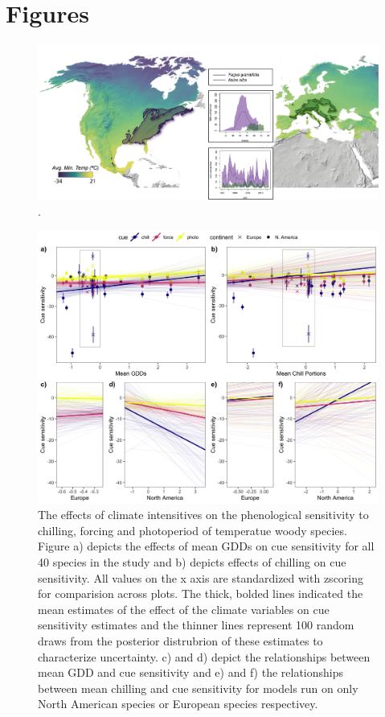\documentclass[12pt]{article}\usepackage[]{graphicx}\usepackage[]{color}
\begin{document}


\section*{Figures}

\begin{figure}[h!]
    \centering
 \includegraphics[width=\textwidth]{..//..//analyses/ranges/figures/concept figure draft2.png} 
    \caption{. }
    \label{fig:concept}
\end{figure}

\begin{figure}[h!]
    \centering
 \includegraphics[width=\textwidth]{..//..//analyses/ranges/figures/mock2.jpeg} 
    \caption{The effects of climate intensitives on the phenological sensitivity to chilling, forcing and photoperiod of temperatue woody species. Figure a) depicts the effects of mean GDDs on cue sensitivity for all 40 species in the study and b) depicts effects of chilling on cue sensitivity. All values on the x axis are standardized with zscoring for comparision across plots. The thick, bolded lines indicated the mean estimates of the effect of the climate variables on cue sensitivity estimates and the thinner lines represent 100 random draws from the posterior distrubrion of these estimates to characterize uncertainty. c) and d) depict the relationships between mean GDD and cue sensitivity and e) and f) the relationships between mean chilling and cue sensitivity for models run on only North American species or European species respectivey. }
    \label{fig:mods1}
\end{figure}
\end{document}

